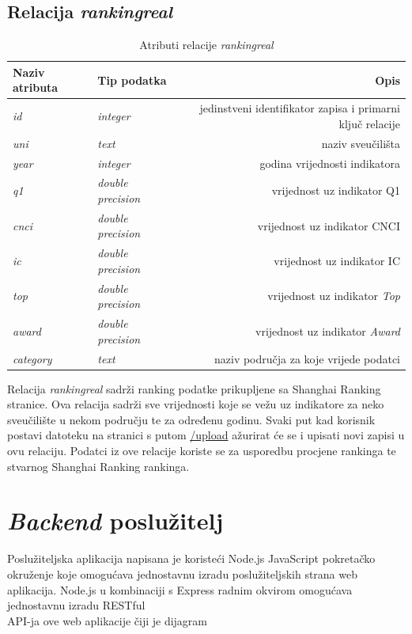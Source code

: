 \documentclass[times, utf8, zavrsni]{fer}
\begin{document}
\subsection{Relacija \emph{rankingreal}}
\begin{table}[htb]
    \caption{Atributi relacije \emph{rankingreal}}
        \label{tbl:rankingreal}
        \centering
        \begin{tabular}{llr} \hline
        Naziv atributa & Tip podatka & Opis\\ \hline
        \emph{id} &  \emph{integer} & jedinstveni identifikator zapisa i primarni ključ relacije\\
        \emph{uni} &  \emph{text} & naziv sveučilišta\\
        \emph{year} &  \emph{integer} & godina vrijednosti indikatora\\
        \emph{q1} &  \emph{double precision} & vrijednost uz indikator Q1\\
        \emph{cnci} &  \emph{double precision} & vrijednost uz indikator CNCI\\
        \emph{ic} &  \emph{double precision} & vrijednost uz indikator IC\\
        \emph{top} &  \emph{double precision} & vrijednost uz indikator \emph{Top}\\
        \emph{award} &  \emph{double precision} & vrijednost uz indikator \emph{Award}\\
        \emph{category} &  \emph{text} & naziv područja za koje vrijede podatci\\
        \end{tabular}
        \end{table}    
        \FloatBarrier 
Relacija \emph{rankingreal} sadrži ranking podatke prikupljene sa Shanghai Ranking stranice. Ova relacija sadrži sve 
vrijednosti koje se vežu uz indikatore za neko sveučilište u nekom području te za određenu godinu. Svaki put kad korisnik 
postavi datoteku na stranici s putom \url{/upload} ažurirat će se i upisati novi zapisi u ovu relaciju. Podatci iz ove 
relacije koriste se za usporedbu procjene rankinga te stvarnog Shanghai Ranking rankinga.
\newpage\section{\emph{Backend} poslužitelj}
Poslužiteljska aplikacija napisana je koristeći Node.js JavaScript pokretačko okruženje koje omogućava jednostavnu izradu poslužiteljskih strana 
web aplikacija. Node.js u kombinaciji s Express radnim okvirom omogućava jednostavnu izradu RESTful \\API-ja ove web aplikacije čiji je dijagram 
\end{document}
